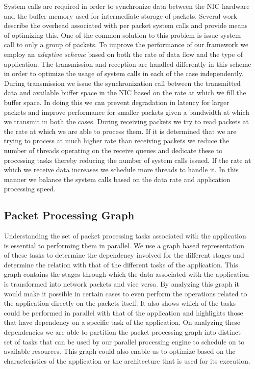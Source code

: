 \documentclass[conference]{IEEEtran}
\begin{document}
System calls are required in order to synchronize data between the NIC hardware and the buffer memory used for intermediate storage of packets. Several work \cite{overhead} describe the overhead associated with per packet system calls and provide means of optimizing this. One of the common solution to this problem is issue system call to only a group of packets. To improve the performance of our framework we employ an \textit{adaptive scheme} based on both the rate of data flow and the type of application. The transmission and reception are handled differently in this scheme in order to optimize the usage of system calls in each of the case independently. During transmission we issue the synchronization call between the transmitted data and available buffer space in the NIC based on the rate at which we fill the buffer space. In doing this we can prevent degradation in latency for larger packets and improve performance for smaller packets given a bandwidth at which we transmit in both the cases. During receiving packets we try to read packets at the rate at which we are able to process them. If it is determined that we are trying to process at much higher rate than receiving packets we reduce the number of threads operating on the receive queues and dedicate these to processing tasks thereby reducing the number of system calls issued. If the rate at which we receive data increases we schedule more threads to handle it. In this manner we balance the system calls based on the data rate and application processing speed.

\subsection{Packet Processing Graph}

Understanding the set of packet processing tasks associated with the application is essential to performing them in parallel. We use a graph based representation of these tasks to determine the dependency involved for the different stages and determine the relation with that of the different tasks of the application. This graph contains the stages through which the data associated with the application is transformed into network packets and vice versa. By analyzing this graph it would make it possible in certain cases to even perform the operations related to the application directly on the packets itself. It also shows which of the tasks could be performed in parallel with that of the application and highlights those that have dependency on a specific task of the application. On analyzing these dependencies we are able to partition the packet processing graph into distinct set of tasks that can be used by our parallel processing engine to schedule on to available resources. This graph could also enable us to optimize based on the characteristics of the application or the architecture that is used for its execution.
\end{document}

